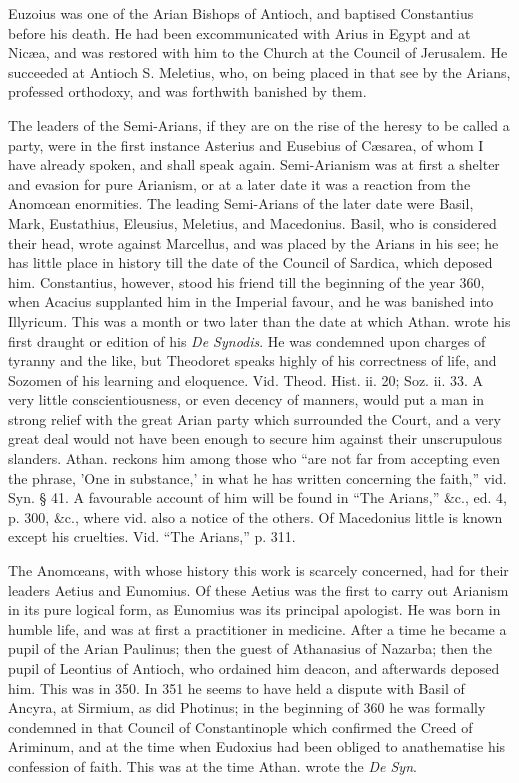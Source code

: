 Euzoius was one of the Arian Bishops of Antioch,
and baptised Constantius before his death. He had been excommunicated
with Arius in Egypt and at Nicæa, and was restored with him to the
Church at the Council of Jerusalem. He succeeded at Antioch S.
Meletius, who, on being placed in that see by the Arians, professed
orthodoxy, and was forthwith banished by them.

The leaders of the Semi-Arians, if they are on
the rise of the heresy to be called a party, were in the first
instance Asterius and Eusebius of Cæsarea, of whom I have already
spoken, and shall speak again. Semi-Arianism was at first a
shelter and evasion for pure Arianism, or at a later date it was a
reaction from the Anomœan enormities. The leading Semi-Arians of the
later date were Basil, Mark, Eustathius, Eleusius, Meletius, and
Macedonius. Basil, who is considered their head, wrote against
Marcellus, and was placed by the Arians in his see; he has little
place in history till the date of the Council of Sardica, which
deposed him. Constantius, however, stood his friend till the beginning
of the year 360, when Acacius supplanted him in the Imperial favour,
and he was banished into Illyricum. This was a month or two later than
the date at which Athan. wrote his first draught or edition of his \emph{De
Synodis}. He was condemned upon charges of tyranny and the like,
but Theodoret speaks highly of his correctness of life, and Sozomen of
his learning and eloquence. Vid. Theod. Hist. ii. 20; Soz. ii. 33. A
very little conscientiousness, or even decency of manners, would put a
man in strong relief with the great Arian party which surrounded the
Court, and a very great deal would not have been enough to secure him
against their unscrupulous slanders. Athan. reckons him among those
who ``are not far from accepting even the phrase, 'One in substance,'
in what he has written concerning the faith,'' vid. Syn. § 41. A
favourable account of him will be found in ``The Arians,'' \&c., ed.
4, p. 300, \&c., where vid. also a notice of the others. Of
Macedonius little is known except his cruelties. Vid. ``The Arians,'' p.
311.

The Anomœans, with whose history this work is
scarcely concerned, had for their leaders Aetius and Eunomius. Of
these Aetius was the first to carry out Arianism in its pure logical
form, as Eunomius was its principal apologist. He was born in humble
life, and was at first a practitioner in medicine. After a time he
became a pupil of the Arian Paulinus; then the guest of Athanasius of
Nazarba; then the pupil of Leontius of Antioch, who ordained him
deacon, and afterwards deposed him. This was in 350. In 351 he seems
to have held a dispute with Basil of Ancyra, at Sirmium, as did
Photinus; in the beginning of 360 he was formally condemned in that
Council of Constantinople which confirmed the Creed of Ariminum, and
at the time when Eudoxius had been obliged to anathematise his
confession of faith. This was at the time Athan. wrote the \emph{De Syn}.

